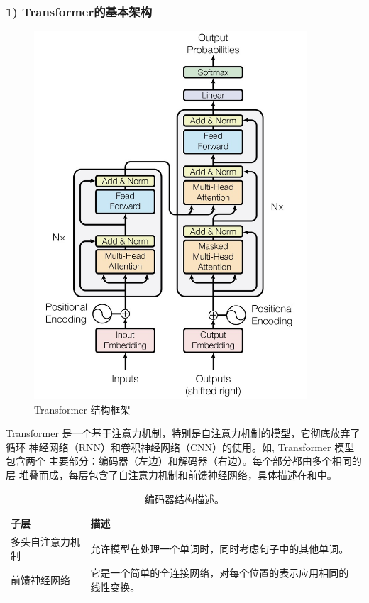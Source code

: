 \subsubsection*{1) Transformer的基本架构}


\begin{figure}[th]
  \centering\includegraphics[width=4in]{figures/xulun/transformer.jpg}
  \caption{Transformer 结构框架\cite{vaswani2017attention}}
  \label{fig1:transformer}
  \end{figure}
Transformer 是一个基于注意力机制，特别是自注意力机制的模型，它彻底放弃了循环
神经网络（RNN）和卷积神经网络（CNN）的使用。如, 
Transformer 模型包含两个
主要部分：编码器（左边）和解码器（右边）。每个部分都由多个相同的层
堆叠而成，每层包含了自注意力机制和前馈神经网络，具体描述在和中。

\begin{table}[h!]
  \centering
  \small
  \begin{tabular}{lp{10cm}}
  \toprule
  \textbf{子层} & \textbf{描述} \\
  \midrule
  多头自注意力机制 & 允许模型在处理一个单词时，同时考虑句子中的其他单词。 \\
  \midrule
  前馈神经网络 & 它是一个简单的全连接网络，对每个位置的表示应用相同的线性变换。 \\
  \bottomrule
  \end{tabular}
  \caption{编码器结构描述。}
  \label{tab1:encoder}
  \end{table}
  
